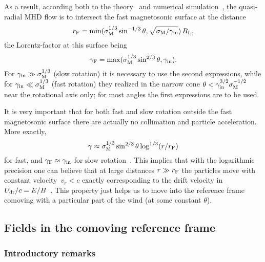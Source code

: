 \documentclass[useAMS,usenatbib]{mn2e}
\begin{document}
As a result, according both to the theory~\citep{bes98, beam2015} and
numerical simulation~\citep{1999MNRAS.305..211B, 2006MNRAS.368.1717B},
the quasi-radial MHD flow is to intersect the fast magnetosonic surface at the distance
\begin{equation}
r_{\rm F} =  {\rm min}(\sigma_{\rm M}^{1/3} \sin^{-1/3}\theta, 
\sqrt{\sigma_{\rm M}/\gamma_{\rm in}}) \, R_{\rm L},
\label{rF}
\end{equation}
the Lorentz-factor at this surface being
\begin{equation}
\gamma_{\rm F} = {\rm max}(\sigma_{\rm M}^{1/3}\sin^{2/3}\theta, \gamma_{\rm in}).
\label{gF}
\end{equation}
For $\gamma_{\rm in} \gg \sigma_{\rm M}^{1/3}$ (slow rotation) it is necessary to use the
second expressions, while for  $\gamma_{\rm in} \ll \sigma_{\rm M}^{1/3}$ (fast rotation)
they realized in the narrow cone $\theta < \gamma_{\rm in}^{3/2}\sigma_{\rm M}^{-1/2}$ near
the rotational axis only; for most angles the first expressions are to be used.

It is very important that for both fast and slow rotation outside the fast magnetosonic
surface there are actually no collimation and particle acceleration. More exactly,
\begin{equation}
\gamma \approx \sigma_{\rm M}^{1/3}\sin^{2/3}\theta \log^{1/3}(r/r_{\rm F})
\end{equation}
for fast, and $\gamma_{\rm F} \approx \gamma_{\rm in}$ for slow 
rotation~\citep{1994PASJ...46..123T, bes98, beam2015}. This implies that 
with the logarithmic precision one can believe that at large 
distances $r \gg r_{\rm F}$ the particles move with constant 
velocity~\mbox{$v_{r} < c$} exactly corresponding to the drift 
velocity in~\mbox{$U_{\rm dr}/c = E/B$}~\citep{2009ApJ...699.1789T, 2010mfca.book.....B}. 
This property just helps us to move into the reference frame comoving with a particular 
part of the wind (at some constant $\theta$).

\subsection{Fields in the comoving reference frame}

\subsubsection{Introductory remarks}
\label{sect:rem}
\end{document}
